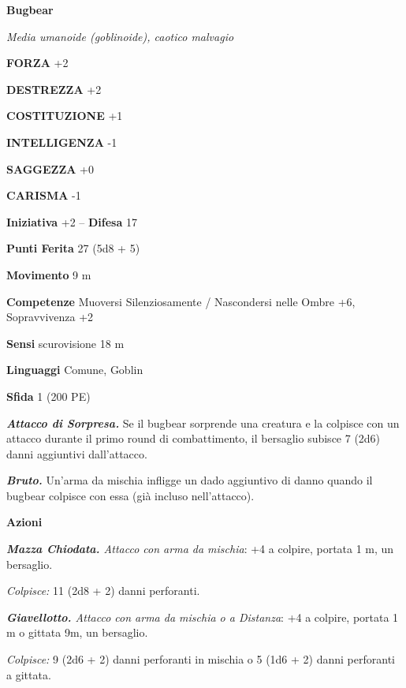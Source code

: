 \begin{multicols}{2}
\medskip{}\textbf{Bugbear}

\emph{Media umanoide (goblinoide), caotico malvagio}

\textbf{FORZA} +2

\textbf{DESTREZZA} +2

\textbf{COSTITUZIONE} +1

\textbf{INTELLIGENZA} -1

\textbf{SAGGEZZA} +0

\textbf{CARISMA} -1

\textbf{Iniziativa} +2 -- \textbf{Difesa} 17

\textbf{Punti Ferita} 27 (5d8 + 5)

\textbf{Movimento} 9 m

\textbf{Competenze} Muoversi Silenziosamente / Nascondersi nelle Ombre +6, Sopravvivenza +2

\textbf{Sensi} scurovisione 18 m

\textbf{Linguaggi} Comune, Goblin

\textbf{Sfida} 1 (200 PE)

\emph{\textbf{Attacco di Sorpresa.}} Se il bugbear sorprende una creatura e la colpisce con un attacco durante il primo round di combattimento, il bersaglio subisce 7 (2d6) danni aggiuntivi
dall'attacco.

\emph{\textbf{Bruto.}} Un'arma da mischia infligge un dado aggiuntivo di danno quando il bugbear colpisce con essa (già incluso nell'attacco).

\textbf{Azioni}

\emph{\textbf{Mazza Chiodata.} Attacco con arma da mischia}: +4 a colpire, portata 1 m, un bersaglio.

\emph{Colpisce:} 11 (2d8 + 2) danni perforanti.

\emph{\textbf{Giavellotto.} Attacco con arma da mischia o a Distanza}: +4 a colpire, portata 1 m o gittata 9m, un bersaglio.

\emph{Colpisce:} 9 (2d6 + 2) danni perforanti in mischia o 5 (1d6 + 2) danni perforanti a gittata.


\end{multicols}

